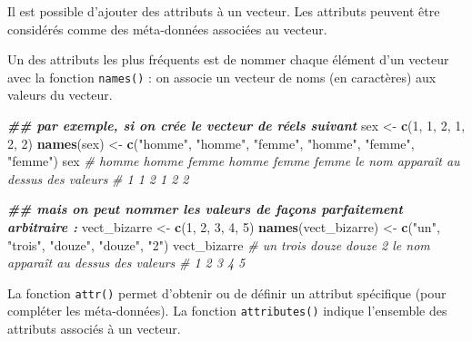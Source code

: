 \documentclass[
]{book}
\newenvironment{Shaded}{\begin{snugshade}}{\end{snugshade}}
\newcommand{\CommentTok}[1]{\textcolor[rgb]{0.56,0.35,0.01}{\textit{#1}}}
\newcommand{\DecValTok}[1]{\textcolor[rgb]{0.00,0.00,0.81}{#1}}
\newcommand{\DocumentationTok}[1]{\textcolor[rgb]{0.56,0.35,0.01}{\textbf{\textit{#1}}}}
\newcommand{\FunctionTok}[1]{\textcolor[rgb]{0.13,0.29,0.53}{\textbf{#1}}}
\newcommand{\NormalTok}[1]{#1}
\newcommand{\OtherTok}[1]{\textcolor[rgb]{0.56,0.35,0.01}{#1}}
\newcommand{\StringTok}[1]{\textcolor[rgb]{0.31,0.60,0.02}{#1}}
\begin{document}
Il est possible d'ajouter des attributs à un vecteur. Les attributs peuvent être considérés comme des méta-données associées au vecteur.

Un des attributs les plus fréquents est de nommer chaque élément d'un vecteur avec la fonction \texttt{names()} : on associe un vecteur de noms (en caractères) aux valeurs du vecteur.

\begin{Shaded}
\begin{Highlighting}[]
\DocumentationTok{\#\# par exemple, si on crée le vecteur de réels suivant}
\NormalTok{sex }\OtherTok{\textless{}{-}} \FunctionTok{c}\NormalTok{(}\DecValTok{1}\NormalTok{, }\DecValTok{1}\NormalTok{, }\DecValTok{2}\NormalTok{, }\DecValTok{1}\NormalTok{, }\DecValTok{2}\NormalTok{, }\DecValTok{2}\NormalTok{)}
\FunctionTok{names}\NormalTok{(sex) }\OtherTok{\textless{}{-}} \FunctionTok{c}\NormalTok{(}\StringTok{"homme"}\NormalTok{, }\StringTok{"homme"}\NormalTok{, }\StringTok{"femme"}\NormalTok{, }\StringTok{"homme"}\NormalTok{, }\StringTok{"femme"}\NormalTok{, }\StringTok{"femme"}\NormalTok{)}
\NormalTok{sex}
\CommentTok{\# homme homme femme homme femme femme     le nom apparaît au dessus des valeurs}
\CommentTok{\#     1     1     2     1     2     2}

\DocumentationTok{\#\# mais on peut nommer les valeurs de façons parfaitement arbitraire : }
\NormalTok{vect\_bizarre }\OtherTok{\textless{}{-}} \FunctionTok{c}\NormalTok{(}\DecValTok{1}\NormalTok{, }\DecValTok{2}\NormalTok{, }\DecValTok{3}\NormalTok{, }\DecValTok{4}\NormalTok{, }\DecValTok{5}\NormalTok{)}
\FunctionTok{names}\NormalTok{(vect\_bizarre) }\OtherTok{\textless{}{-}} \FunctionTok{c}\NormalTok{(}\StringTok{"un"}\NormalTok{, }\StringTok{"trois"}\NormalTok{, }\StringTok{"douze"}\NormalTok{, }\StringTok{"douze"}\NormalTok{, }\StringTok{"2"}\NormalTok{)}
\NormalTok{vect\_bizarre}
\CommentTok{\# un trois douze douze     2              le nom apparaît au dessus des valeurs}
\CommentTok{\#  1     2     3     4     5}
\end{Highlighting}
\end{Shaded}

La fonction \texttt{attr()} permet d'obtenir ou de définir un attribut spécifique (pour compléter les méta-données). La fonction \texttt{attributes()} indique l'ensemble des attributs associés à un vecteur.
\end{document}
